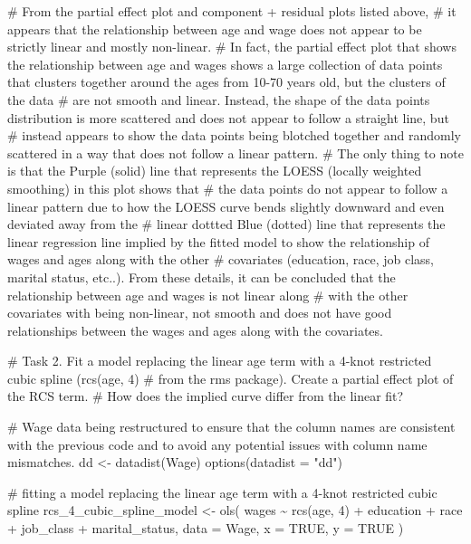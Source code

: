 \documentclass[
  letterpaper,
  DIV=11,
  numbers=noendperiod]{scrreprt}
\newenvironment{Shaded}{\begin{snugshade}}{\end{snugshade}}
\newcommand{\AttributeTok}[1]{\textcolor[rgb]{0.40,0.45,0.13}{#1}}
\newcommand{\CommentTok}[1]{\textcolor[rgb]{0.37,0.37,0.37}{#1}}
\newcommand{\ConstantTok}[1]{\textcolor[rgb]{0.56,0.35,0.01}{#1}}
\newcommand{\DecValTok}[1]{\textcolor[rgb]{0.68,0.00,0.00}{#1}}
\newcommand{\FunctionTok}[1]{\textcolor[rgb]{0.28,0.35,0.67}{#1}}
\newcommand{\NormalTok}[1]{\textcolor[rgb]{0.00,0.23,0.31}{#1}}
\newcommand{\OtherTok}[1]{\textcolor[rgb]{0.00,0.23,0.31}{#1}}
\newcommand{\SpecialCharTok}[1]{\textcolor[rgb]{0.37,0.37,0.37}{#1}}
\newcommand{\StringTok}[1]{\textcolor[rgb]{0.13,0.47,0.30}{#1}}
\begin{document}
{\begin{Shaded}
\begin{Highlighting}[]
\CommentTok{\# From the partial effect plot and component + residual plots listed above, }
\CommentTok{\# it appears that the relationship between age and wage does not appear to be strictly linear and mostly non{-}linear. }
\CommentTok{\# In fact, the partial effect plot that shows the relationship between age and wages shows a large collection of data points that clusters together around the ages from 10{-}70 years old, but the clusters of the data}
\CommentTok{\# are not smooth and linear. Instead, the shape of the data points distribution is more scattered and does not appear to follow a straight line, but }
\CommentTok{\# instead appears to show the data points being blotched together and randomly scattered in a way that does not follow a linear pattern. }
\CommentTok{\# The only thing to note is that the Purple (solid) line that represents the LOESS (locally weighted smoothing) in this plot shows that}
\CommentTok{\# the data points do not appear to follow a linear pattern due to how the LOESS curve bends slightly downward and even deviated away from the }
\CommentTok{\# linear dottted Blue (dotted) line that represents the linear regression line implied by the fitted model to show the relationship of wages and ages along with the other }
\CommentTok{\# covariates (education, race, job class, marital status, etc..). From these details, it can be concluded that the relationship between age and wages is not linear along}
\CommentTok{\# with the other covariates with being non{-}linear, not smooth and does not have good relationships between the wages and ages along with the covariates.}


\CommentTok{\# Task 2. Fit a model replacing the linear age term with a 4{-}knot restricted cubic spline (rcs(age, 4)}
\CommentTok{\# from the rms package). Create a partial effect plot of the RCS term. }
\CommentTok{\# How does the implied curve differ from the linear fit?}

\CommentTok{\# Wage data being restructured to ensure that the column names are consistent with the previous code and to avoid any potential issues with column name mismatches.}
\NormalTok{dd }\OtherTok{\textless{}{-}} \FunctionTok{datadist}\NormalTok{(Wage)}
\FunctionTok{options}\NormalTok{(}\AttributeTok{datadist =} \StringTok{"dd"}\NormalTok{)}

\CommentTok{\# fitting a model replacing the linear age term with a 4{-}knot restricted cubic spline}
\NormalTok{rcs\_4\_cubic\_spline\_model }\OtherTok{\textless{}{-}} \FunctionTok{ols}\NormalTok{(}
\NormalTok{  wages }\SpecialCharTok{\textasciitilde{}} \FunctionTok{rcs}\NormalTok{(age, }\DecValTok{4}\NormalTok{) }\SpecialCharTok{+}\NormalTok{ education }\SpecialCharTok{+}\NormalTok{ race }\SpecialCharTok{+}\NormalTok{ job\_class }\SpecialCharTok{+}\NormalTok{ marital\_status,}
  \AttributeTok{data =}\NormalTok{ Wage, }\AttributeTok{x =} \ConstantTok{TRUE}\NormalTok{, }\AttributeTok{y =} \ConstantTok{TRUE}
\NormalTok{)}


\end{Highlighting}
\end{Shaded}}
\end{document}
